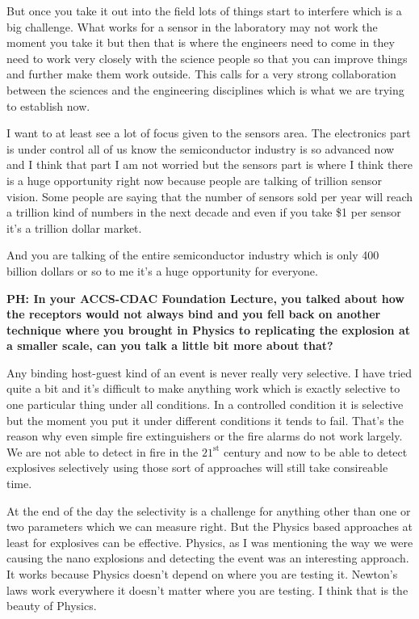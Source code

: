 \begin{multicols}{2}
But once you take it out into the field lots of things start to interfere which is a big challenge. What works for a sensor in the laboratory may not work the moment you take it but then that is where the engineers need to come in they need to work very closely with the science people so that you can improve things and further make them work outside. This calls for a very strong collaboration between the sciences and the engineering disciplines which is what we are trying to establish now.

I want to at least see a lot of focus given to the sensors area. The electronics part is under control all of us know the semiconductor industry is so advanced now and I think that part I am not worried but the sensors part is where I think there is a huge opportunity right now because people are talking of trillion sensor vision. Some people are saying that the number of sensors sold per year will reach a trillion kind of numbers in the next decade and even if you take \$1 per sensor it’s a trillion dollar market.

And you are talking of the entire semiconductor industry which is only 400 billion dollars or so to me it’s a huge opportunity for everyone.

\textbf{PH: In your ACCS-CDAC Foundation Lecture, you talked about how the receptors would not always bind and you fell back on another technique where you brought in Physics to replicating the explosion at a smaller scale, can you talk a little bit more about that?}

 Any binding host-guest kind of an event is never really very selective. I have tried quite a bit and it’s difficult to make anything work which is exactly selective to one particular thing under all conditions. In a controlled condition it is selective but the moment you put it under different conditions it tends to fail. That’s the reason why even simple fire extinguishers or the fire alarms do not work largely. We are not able to detect in fire in the $21^{\text{st}}$ century and now to be able to detect explosives selectively using those sort of approaches will still take consireable time.

\vskip -0.2cm

At the end of the day the selectivity is a challenge for anything other than one or two parameters which we can measure right. But the Physics based approaches at least for explosives can be effective. Physics, as I was mentioning the way we were causing the nano explosions and detecting the event was an interesting approach. It works because Physics doesn’t depend on where you are testing it. Newton’s laws work everywhere it doesn’t matter where you are testing. I think that is the beauty of Physics.


\end{multicols}
